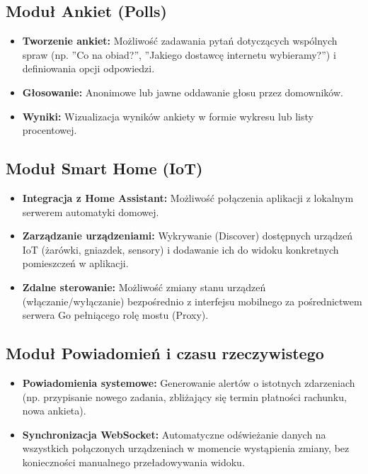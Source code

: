 \subsection{Moduł Ankiet (Polls)}
\begin{itemize}
    \item \textbf{Tworzenie ankiet:} Możliwość zadawania pytań dotyczących wspólnych spraw (np. ''Co na obiad?'', ''Jakiego dostawcę internetu wybieramy?'') i definiowania opcji odpowiedzi.
    \item \textbf{Głosowanie:} Anonimowe lub jawne oddawanie głosu przez domowników.
    \item \textbf{Wyniki:} Wizualizacja wyników ankiety w formie wykresu lub listy procentowej.
\end{itemize}

\subsection{Moduł Smart Home (IoT)}
\begin{itemize}
    \item \textbf{Integracja z Home Assistant:} Możliwość połączenia aplikacji z lokalnym serwerem automatyki domowej.
    \item \textbf{Zarządzanie urządzeniami:} Wykrywanie (Discover) dostępnych urządzeń IoT (żarówki, gniazdek, sensory) i dodawanie ich do widoku konkretnych pomieszczeń w aplikacji.
    \item \textbf{Zdalne sterowanie:} Możliwość zmiany stanu urządzeń (włączanie/wyłączanie) bezpośrednio z interfejsu mobilnego za pośrednictwem serwera Go pełniącego rolę mostu (Proxy).
\end{itemize}

\subsection{Moduł Powiadomień i czasu rzeczywistego}
\begin{itemize}
    \item \textbf{Powiadomienia systemowe:} Generowanie alertów o istotnych zdarzeniach (np. przypisanie nowego zadania, zbliżający się termin płatności rachunku, nowa ankieta).
    \item \textbf{Synchronizacja WebSocket:} Automatyczne odświeżanie danych na wszystkich połączonych urządzeniach w momencie wystąpienia zmiany, bez konieczności manualnego przeładowywania widoku.
\end{itemize}

